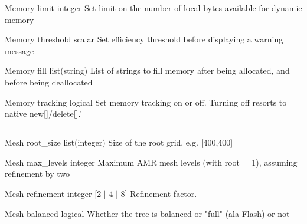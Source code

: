 \documentclass{article}
\begin{document}
\Parameter
{Memory}
{}
{limit}
{integer}
{}
{Set limit on the number of local bytes available for dynamic memory}
{}
{}

\Parameter
{Memory}
{}
{threshold}
{scalar}
{}
{Set efficiency threshold before displaying a warning message}
{}
{}

\Parameter
{Memory}
{}
{fill}
{list(string)}
{}
{List of strings to fill memory after being allocated, and before being deallocated}
{}
{}

\Parameter
{Memory}
{}
{tracking}
{logical}
{}
{Set memory tracking on or off. Turning off resorts to native new[]/delete[].'}
{}
{}

\subsection{}

\Parameter
{Mesh}
{}
{root\_size}
{list(integer)}
{}
{Size of the root grid, e.g. [400,400]}
{}
{}

\Parameter
{Mesh}
{}
{max\_levels}
{integer}
{}
{Maximum AMR mesh levels (with root = 1), assuming refinement by two}
{}
{}

\Parameter
{Mesh}
{}
{refinement}
{integer}
{[2 $|$ 4 $|$ 8]}
{Refinement factor.}
{}
{}

\Parameter
{Mesh}
{}
{balanced}
{logical}
{}
{Whether the tree is balanced or "full" (ala Flash) or not}
{}
{}
\end{document}
